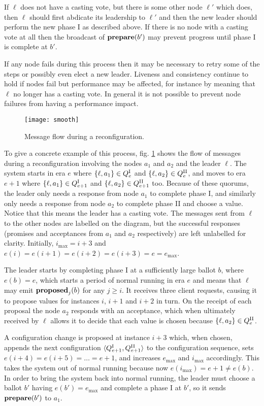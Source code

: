 \documentclass[journal]{IEEEtran}
\begin{document}
If $\ell$ does not have a casting vote, but there is some other node $\ell'$
which does, then $\ell$ should first abdicate its leadership to $\ell'$ and
then the new leader should perform the new phase I as described above. If there
is no node with a casting vote at all then the broadcast of $\mathbf{prepare}(b')$ may
prevent progress until phase I is complete at $b'$.

If any node fails during this process then it may be necessary to retry some of
the steps or possibly even elect a new leader. Liveness and consistency
continue to hold if nodes fail but performance may be affected, for instance by
meaning that $\ell$ no longer has a casting vote. In general it is not possible
to prevent node failures from having a performance impact.

\begin{figure}[!t]
\centering
\texttt{[image: smooth]}
\caption{Message flow during a reconfiguration. \label{seq-diag-smooth}}
\end{figure}

To give a concrete example of this process, fig. \ref{seq-diag-smooth} shows
the flow of messages during a reconfiguration involving the nodes $a_1$ and
$a_2$ and the leader $\ell$. The system starts in era $e$ where $\{\ell, a_1\}
\in {Q}^\textrm{I}_{e}$ and $\{\ell, a_2\} \in {Q}^\textrm{II}_{e}$, and moves to era $e+1$ where
$\{\ell, a_1\} \in {Q}^\textrm{I}_{e+1}$ and $\{\ell, a_2\} \in {Q}^\textrm{II}_{e+1}$ too. Because of
these quorums, the leader only needs a response from node $a_1$ to complete
phase I, and similarly only needs a response from node $a_2$ to complete phase
II and choose a value. Notice that this means the leader has a casting vote.
The messages sent from $\ell$ to the other nodes are labelled on the diagram,
but the successful responses (promises and acceptances from $a_1$ and $a_2$
respectively) are left unlabelled for clarity. Initially, $i_\mathrm{max} =
i+3$ and $e(i) = e(i+1) = e(i+2) = e(i+3) = e = e_\mathrm{max}$.

The leader starts by completing phase I at a sufficiently large ballot $b$,
where $e(b) = e$, which starts a period of normal running in era $e$ and means
that $\ell$ may emit $\mathbf{proposed}_{j}(b)$ for any $j \ge i$. It receives three client
requests, causing it to propose values for instances $i$, $i+1$ and $i+2$ in
turn.  On the receipt of each proposal the node $a_2$ responds with an
acceptance, which when ultimately received by $\ell$ allows it to decide that
each value is chosen because $\{ \ell, a_2 \} \in {Q}^\textrm{II}_{e}$.

A configuration change is proposed at instance $i+3$ which, when chosen,
appends the next configuration $\langle {Q}^\textrm{I}_{e+1}, {Q}^\textrm{II}_{e+1} \rangle$ to the
configuration sequence, sets $e(i+4) = e(i+5) = \ldots = e+1$, and increases
$e_\mathrm{max}$ and $i_\mathrm{max}$ accordingly. This takes the system out of
normal running because now $e(i_\mathrm{max}) = e + 1 \ne e(b)$.  In order to
bring the system back into normal running, the leader must choose a ballot $b'$
having $e(b') = e_\mathrm{max}$ and complete a phase I at $b'$, so it sends
$\mathbf{prepare}(b')$ to $a_1$.
\end{document}
